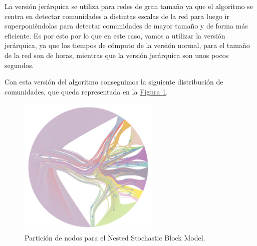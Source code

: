 \documentclass[paper=a4, fontsize=11pt]{article} %
\numberwithin{equation}{section} %
\numberwithin{figure}{section} %
\numberwithin{table}{section} %
\begin{document}
La versión jerárquica se utiliza para redes de gran tamaño ya que el algoritmo se centra en detectar comunidades a distintas escalas de la red para luego ir superponiéndolas para detectar comunidades de mayor tamaño y de forma más eficiente. Es por esto por lo que en este caso, vamos a utilizar la versión jerárquica, ya que los tiempos de cómputo de la versión normal, para el tamaño de la red son de horas, mientras que la versión jerárquica son unos pocos segundos.

Con esta versión del algoritmo conseguimos la siguiente distribución de comunidades, que queda representada en la \hyperref[im9]{Figura \ref*{im9}}.

\begin{figure}[H]
  \centering
  \includegraphics[width=0.6\textwidth]{stoc}
  \caption{Partición de nodos para el Nested Stochastic Block Model.}
  \label{im9}
\end{figure}
\end{document}
